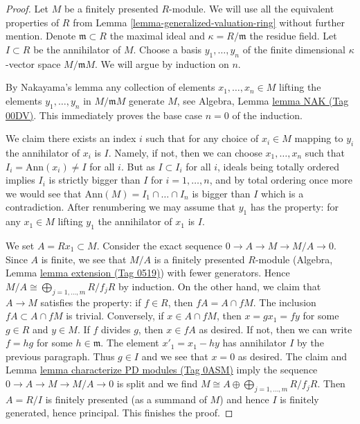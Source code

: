 \documentclass{amsart}
\theoremstyle{plain}
\theoremstyle{definition}
\theoremstyle{remark}
\numberwithin{equation}{subsection}
\begin{document}
\begin{proof}
Let $M$ be a finitely presented $R$-module. We will use all
the equivalent properties of $R$ from
Lemma \ref{lemma-generalized-valuation-ring}
without further mention. Denote $\mathfrak m \subset R$
the maximal ideal and $\kappa = R/\mathfrak m$ the residue field.
Let $I \subset R$ be the annihilator of $M$.
Choose a basis $y_1, \ldots, y_n$ of the finite dimensional
$\kappa$-vector space $M/\mathfrak m M$. We will argue
by induction on $n$.

\medskip\noindent
By Nakayama's lemma any collection of elements $x_1, \ldots, x_n \in M$
lifting the elements $y_1, \ldots, y_n$ in $M/\mathfrak m M$
generate $M$, see Algebra, Lemma \href{https://stacks.math.columbia.edu/tag/00DV}{lemma NAK (Tag 00DV)}.
This immediately proves the base case $n = 0$ of the induction.

\medskip\noindent
We claim there exists an index $i$ such that for any choice
of $x_i \in M$ mapping to $y_i$ the annihilator of $x_i$ is $I$.
Namely, if not, then we can choose $x_1, \ldots, x_n$ such
that $I_i = \text{Ann}(x_i) \not = I$ for all $i$. But as
$I \subset I_i$ for all $i$, ideals being totally ordered
implies $I_i$ is strictly bigger than $I$ for $i = 1, \ldots, n$,
and by total ordering once more we would see that
$\text{Ann}(M) = I_1 \cap \ldots \cap I_n$ is bigger than $I$
which is a contradiction. After renumbering we may assume that
$y_1$ has the property: for any $x_1 \in M$ lifting $y_1$
the annihilator of $x_1$ is $I$.

\medskip\noindent
We set $A = Rx_1 \subset M$. Consider the exact sequence
$0 \to A \to M \to M/A \to 0$. Since $A$ is finite, we see that
$M/A$ is a finitely presented $R$-module
(Algebra, Lemma \href{https://stacks.math.columbia.edu/tag/0519}{lemma extension (Tag 0519)}) with fewer generators.
Hence $M/A \cong \bigoplus_{j = 1, \ldots, m} R/f_jR$ by induction.
On the other hand, we claim that $A \to M$ satisfies the property:
if $f \in R$, then $fA = A \cap fM$. The inclusion $fA \subset A \cap fM$
is trivial. Conversely, if $x \in A \cap fM$, then $x = gx_1 = f y$
for some $g \in R$ and $y \in M$. If $f$ divides $g$, then $x \in fA$
as desired. If not, then we can write $f = hg$ for some $h \in \mathfrak m$.
The element $x'_1 = x_1 - hy$ has annihilator $I$ by the previous
paragraph. Thus $g \in I$ and we see that $x = 0$ as desired.
The claim and Lemma \href{https://stacks.math.columbia.edu/tag/0ASM}{lemma characterize PD modules (Tag 0ASM)}
imply the sequence $0 \to A \to M \to M/A \to 0$ is split
and we find $M \cong A \oplus \bigoplus_{j = 1, \ldots, m} R/f_jR$.
Then $A = R/I$ is finitely presented (as a summand of $M$)
and hence $I$ is finitely generated, hence principal.
This finishes the proof.
\end{proof}
\end{document}
